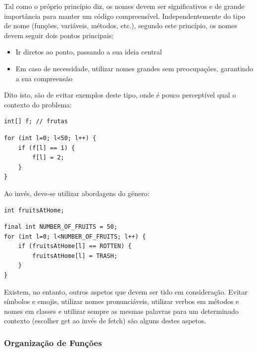 \documentclass[10pt,portuguese]{article}
\begin{document}
\par Tal como o próprio princípio diz, os nomes devem ser significativos e de grande importância para manter um código compreensível. Independentemente do tipo de nome (funções, variáveis, métodos, etc.), segundo este princípio, os nomes devem seguir dois pontos principais:

\begin{itemize}
    \item Ir diretos ao ponto, passando a sua ideia central
    \item Em caso de necessidade, utilizar nomes grandes sem preocupações, garantindo a sua compreensão
\end{itemize}

\clearpage

\par Dito isto, são de evitar exemplos deste tipo, onde é pouco perceptível qual o contexto do problema:

\begin{lstlisting}
int[] f; // frutas
\end{lstlisting}

\begin{lstlisting}
for (int l=0; l<50; l++) {
	if (f[l] == 1) {
	    f[l] = 2;
	}
}
\end{lstlisting}

\par Ao invés, deve-se utilizar abordagens do género:

\begin{lstlisting}
int fruitsAtHome;
\end{lstlisting}

\begin{lstlisting}
final int NUMBER_OF_FRUITS = 50;
for (int l=0; l<NUMBER_OF_FRUITS; l++) {
	if (fruitsAtHome[l] == ROTTEN) {
	    fruitsAtHome[l] = TRASH;
	}
}
\end{lstlisting}

\par Existem, no entanto, outros aspetos que devem ser tido em consideração. Evitar símbolos e emojis, utilizar nomes pronunciáveis, utilizar verbos em métodos e nomes em classes e utilizar sempre as mesmas palavras para um determinado contexto (escolher get ao invés de fetch) são alguns destes aspetos.

\subsubsection{Organização de Funções}
\end{document}
